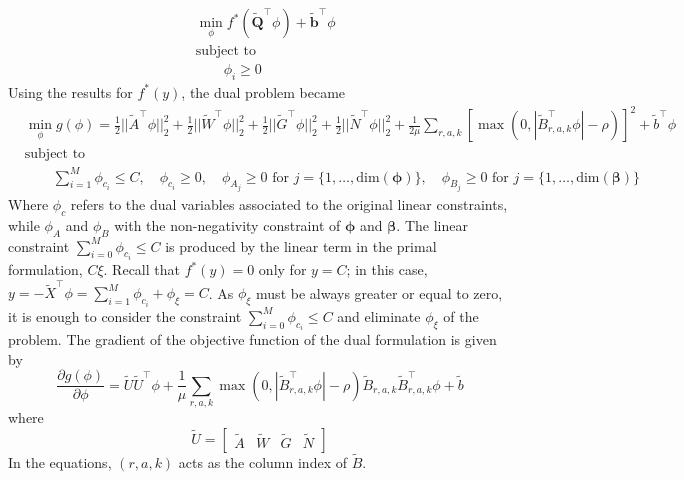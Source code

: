 \documentclass[10pt,letterpaper]{article}
\newcommand{\+}[1]{\ensuremath{{\boldsymbol #1}}}
\begin{document}
\begin{equation}
\begin{split}
&\min_{\phi} f^*(\tilde{\+Q}^\top \phi) + \tilde{\+b}^\top \phi\\
&\mbox{subject to}\\
&\quad\quad \phi_i \ge 0
\end{split}
\end{equation}
Using the results for $f^*(y)$, the dual problem became
\begin{equation}
\begin{split}
&\min_{\phi} g(\phi) = \frac{1}{2}||\tilde{A}^\top \phi||_2^2 + \frac{1}{2}||\tilde{W}^\top \phi||_2^2 + \frac{1}{2}||\tilde{G}^\top \phi||_2^2 + \frac{1}{2}||\tilde{N}^\top \phi||_2^2 + \frac{1}{2\mu}\sum_{r,a,k}[\max(0,|\tilde{B}_{r,a,k}^\top \phi| - \rho)]^2 + \tilde{b}^\top \phi \\
& \mbox{subject to} \\
&\quad\quad \sum_{i=1}^M \phi_{c_i} \leq C,\quad \phi_{c_i} \ge 0,\quad \phi_{A_j} \ge 0 \mbox{ for }j=\{1,\dots,\text{dim}(\+\phi)\}, \quad \phi_{B_j} \ge 0 \mbox{ for }j=\{1,\dots,\text{dim}(\+\beta)\}
\end{split}
\end{equation}
Where $\phi_c$ refers to the dual variables associated to the original linear constraints, while $\phi_A$ and $\phi_B$ with the non-negativity constraint of $\+\phi$ and $\+\beta$. The linear constraint $\sum_{i=0}^M \phi_{c_i} \leq C$ is produced by the linear term in the primal formulation, $C\xi$. Recall that $f^*(y) = 0$ only for $y = C$; in this case, $y = -\tilde{X}^\top \phi = \sum_{i=1}^M \phi_{c_i} + \phi_{\xi} = C$. As $\phi_{\xi}$ must be always greater or equal to zero, it is enough to consider the constraint $\sum_{i=0}^M \phi_{c_i} \leq C$ and eliminate $\phi_{\xi}$ of the problem.
The gradient of the objective function of the dual formulation is given by
\begin{equation}
\frac{\partial g(\phi) }{\partial \phi} = \tilde{U}\tilde{U}^\top \phi + \frac{1}{\mu}\sum_{r,a,k}\max(0,|\tilde{B}_{r,a,k}^\top\phi|-\rho)\tilde{B}_{r,a,k}\tilde{B}_{r,a,k}^\top\phi + \tilde{b}
\end{equation}
where
\begin{equation}
\tilde{U} = \begin{bmatrix} \tilde{A} & \tilde{W} & \tilde{G} & \tilde{N} \end{bmatrix}
\end{equation} 
In the equations, $(r,a,k)$ acts as the column index of $\tilde{B}$.
\end{document}
